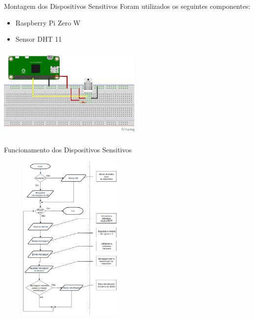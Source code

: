 \documentclass{beamer}
\begin{document}
    \begin{frame}{Montagem dos Dispositivos Sensitivos}
      \quad Foram utilizados os seguintes componentes:
      \begin{itemize}
        \item Raspberry Pi Zero W
        \item Sensor DHT 11
      \end{itemize}
      \begin{center}
      \includegraphics[height=130pt, width=200pt]{sensor}
      \end{center}
    \end{frame}

    \begin{frame}{Funcionamento dos Dispositivos Sensitivos}
      \begin{center}
      \includegraphics[height=235pt, width=200pt]{fluxogramaSensor}
      \end{center}
    \end{frame}
\end{document}
